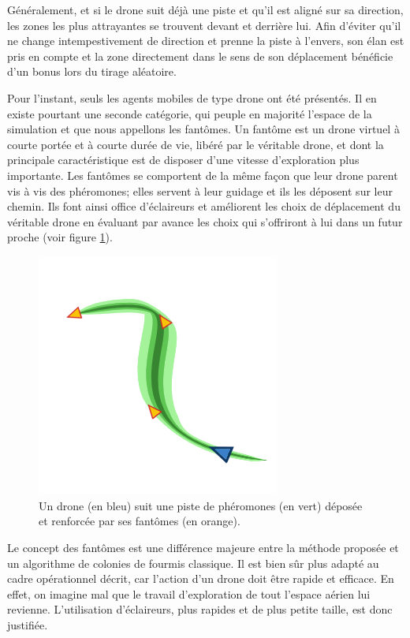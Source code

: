 \documentclass[12pt]{article}
\begin{document}
Généralement, et si le drone suit déjà une piste et qu'il est aligné
sur sa direction, les zones les plus attrayantes se trouvent devant et
derrière lui. Afin d'éviter qu'il ne change intempestivement de
direction et prenne la piste à l'envers, son élan est pris en compte
et la zone directement dans le sens de son déplacement bénéficie d'un
bonus lors du tirage aléatoire.

Pour l'instant, seuls les agents mobiles de type drone ont été
présentés. Il en existe pourtant une seconde catégorie, qui peuple en
majorité l'espace de la simulation et que nous appellons les
fantômes. Un fantôme est un drone virtuel à courte portée et à courte
durée de vie, libéré par le véritable drone, et dont la principale
caractéristique est de disposer d'une vitesse d'exploration plus
importante.  Les fantômes se comportent de la même façon que leur
drone parent vis à vis des phéromones; elles servent à leur guidage et
ils les déposent sur leur chemin. Ils font ainsi office d'éclaireurs
et améliorent les choix de déplacement du véritable drone en évaluant
par avance les choix qui s'offriront à lui dans un futur proche (voir
figure \ref{ghosts}).

\begin{figure}[H]
  \centering

  \includegraphics[width=8cm]{ghosts.png}

  \caption{Un drone (en bleu) suit une piste de phéromones (en vert)
    déposée et renforcée par ses fantômes (en orange).}
  \label{ghosts}
\end{figure}

Le concept des fantômes est une différence majeure entre la méthode
proposée et un algorithme de colonies de fourmis classique. Il est
bien sûr plus adapté au cadre opérationnel décrit, car l'action d'un
drone doit être rapide et efficace. En effet, on imagine mal que le
travail d'exploration de tout l'espace aérien lui
revienne. L'utilisation d'éclaireurs, plus rapides et de plus petite
taille, est donc justifiée.
\end{document}
